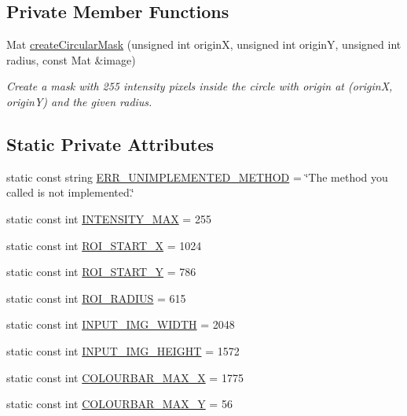 \subsection*{\-Private \-Member \-Functions}
\begin{DoxyCompactItemize}
\item 
\-Mat \hyperlink{classmultiscale_1_1analysis_1_1CircularMatFactory_a94f2562c9045f2373b3e2736608de8c7}{create\-Circular\-Mask} (unsigned int origin\-X, unsigned int origin\-Y, unsigned int radius, const \-Mat \&image)
\begin{DoxyCompactList}\small\item\em \-Create a mask with 255 intensity pixels inside the circle with origin at (origin\-X, origin\-Y) and the given radius. \end{DoxyCompactList}\end{DoxyCompactItemize}
\subsection*{\-Static \-Private \-Attributes}
\begin{DoxyCompactItemize}
\item 
static const string \hyperlink{classmultiscale_1_1analysis_1_1CircularMatFactory_a7f4120aa31ff324ddb5c90e14cfeeb6d}{\-E\-R\-R\-\_\-\-U\-N\-I\-M\-P\-L\-E\-M\-E\-N\-T\-E\-D\-\_\-\-M\-E\-T\-H\-O\-D} = \char`\"{}\-The method you called is not implemented.\char`\"{}
\item 
static const int \hyperlink{classmultiscale_1_1analysis_1_1CircularMatFactory_a37f5cabf6d03d157cf96fb745e1da0ca}{\-I\-N\-T\-E\-N\-S\-I\-T\-Y\-\_\-\-M\-A\-X} = 255
\item 
static const int \hyperlink{classmultiscale_1_1analysis_1_1CircularMatFactory_a0e2da07df4736b0ec21567721ae94af5}{\-R\-O\-I\-\_\-\-S\-T\-A\-R\-T\-\_\-\-X} = 1024
\item 
static const int \hyperlink{classmultiscale_1_1analysis_1_1CircularMatFactory_a94368fde6348afd7074491c2cf333910}{\-R\-O\-I\-\_\-\-S\-T\-A\-R\-T\-\_\-\-Y} = 786
\item 
static const int \hyperlink{classmultiscale_1_1analysis_1_1CircularMatFactory_af26e9372a9bfb4428e9bdef952afedff}{\-R\-O\-I\-\_\-\-R\-A\-D\-I\-U\-S} = 615
\item 
static const int \hyperlink{classmultiscale_1_1analysis_1_1CircularMatFactory_a1c85fef366f2b3674a0c58394e441908}{\-I\-N\-P\-U\-T\-\_\-\-I\-M\-G\-\_\-\-W\-I\-D\-T\-H} = 2048
\item 
static const int \hyperlink{classmultiscale_1_1analysis_1_1CircularMatFactory_afdc7e6c3051b6767fa9e1a38257f1aa2}{\-I\-N\-P\-U\-T\-\_\-\-I\-M\-G\-\_\-\-H\-E\-I\-G\-H\-T} = 1572
\item 
static const int \hyperlink{classmultiscale_1_1analysis_1_1CircularMatFactory_a57e022b6cb2066b59e6f1988986ce6ad}{\-C\-O\-L\-O\-U\-R\-B\-A\-R\-\_\-\-M\-A\-X\-\_\-\-X} = 1775
\item 
static const int \hyperlink{classmultiscale_1_1analysis_1_1CircularMatFactory_a288197056f07989be0503e08a2745bed}{\-C\-O\-L\-O\-U\-R\-B\-A\-R\-\_\-\-M\-A\-X\-\_\-\-Y} = 56
\end{DoxyCompactItemize}


